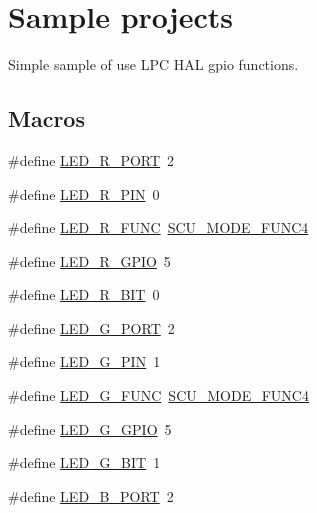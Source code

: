 \hypertarget{group__samples}{}\section{Sample projects}
\label{group__samples}


Simple sample of use L\+PC H\+AL gpio functions.  


\subsection*{Macros}
\begin{DoxyCompactItemize}
\item 
\#define \hyperlink{group__samples_ga5a11a7cbc215e25401541277460113a4}{L\+E\+D\+\_\+\+R\+\_\+\+P\+O\+RT}~2
\item 
\#define \hyperlink{group__samples_ga22f3cf4ef9dadad8d78d5c59999100b6}{L\+E\+D\+\_\+\+R\+\_\+\+P\+IN}~0
\item 
\#define \hyperlink{group__samples_ga55748801f9d61d2cdab4665b61f73147}{L\+E\+D\+\_\+\+R\+\_\+\+F\+U\+NC}~\hyperlink{group___s_c_u__18_x_x__43_x_x_gaf1b58bdd83fd9b8331aaa1d54420a656}{S\+C\+U\+\_\+\+M\+O\+D\+E\+\_\+\+F\+U\+N\+C4}
\item 
\#define \hyperlink{group__samples_ga938c5edc31fe4ba21d42ac85c739bc9b}{L\+E\+D\+\_\+\+R\+\_\+\+G\+P\+IO}~5
\item 
\#define \hyperlink{group__samples_ga770cf8cc93e5ceb6b347f655d5425f03}{L\+E\+D\+\_\+\+R\+\_\+\+B\+IT}~0
\item 
\#define \hyperlink{group__samples_ga1ef377b425c83109ec7998dc6fa71345}{L\+E\+D\+\_\+\+G\+\_\+\+P\+O\+RT}~2
\item 
\#define \hyperlink{group__samples_ga3d793023ce3cf36a952b0b68ab1a389a}{L\+E\+D\+\_\+\+G\+\_\+\+P\+IN}~1
\item 
\#define \hyperlink{group__samples_ga5a49819d3be4ff9d93877a0cacb232f3}{L\+E\+D\+\_\+\+G\+\_\+\+F\+U\+NC}~\hyperlink{group___s_c_u__18_x_x__43_x_x_gaf1b58bdd83fd9b8331aaa1d54420a656}{S\+C\+U\+\_\+\+M\+O\+D\+E\+\_\+\+F\+U\+N\+C4}
\item 
\#define \hyperlink{group__samples_gab4f388402d4d678445fee6617f96128d}{L\+E\+D\+\_\+\+G\+\_\+\+G\+P\+IO}~5
\item 
\#define \hyperlink{group__samples_gae425f2df67fc802fcf8a442a57a92c81}{L\+E\+D\+\_\+\+G\+\_\+\+B\+IT}~1
\item 
\#define \hyperlink{group__samples_ga24baefd05a8dea1a7241e288a735c17c}{L\+E\+D\+\_\+\+B\+\_\+\+P\+O\+RT}~2
\item 

\end{DoxyCompactItemize}
